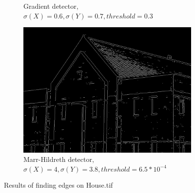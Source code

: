 \documentclass[a4paper]{article}
\begin{document}
\begin{figure}
\begin{subfigure}[b]{0.3\textwidth}
                \caption{Gradient detector, $\sigma (X) = 0.6, \sigma (Y) = 0.7, threshold = 0.3$}
                \label{fig:1b}
                
        \end{subfigure}
        \begin{subfigure}[b]{0.3\textwidth}
                \centering
                \includegraphics[width=\textwidth]{q1-house-mh.png}
                \caption{Marr-Hildreth detector, $\sigma (X) = 4, \sigma (Y) = 3.8, threshold = 6.5*10^{-4}$}
                \label{fig:1c}
                
        \end{subfigure}
        
        \caption{Results of finding edges on House.tif}        
        \label{fig:1}
\end{figure}
\end{document}
